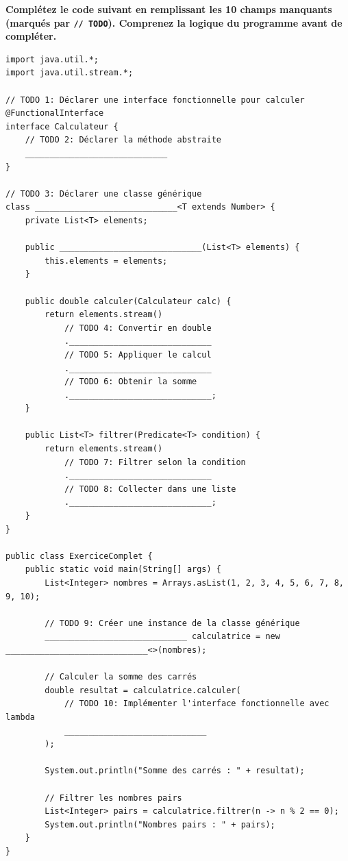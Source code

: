 \documentclass[11pt,a4paper]{article}
\begin{document}
\textbf{Complétez le code suivant en remplissant les 10 champs manquants (marqués par \texttt{// TODO}). Comprenez la logique du programme avant de compléter.}

\begin{lstlisting}
import java.util.*;
import java.util.stream.*;

// TODO 1: Déclarer une interface fonctionnelle pour calculer
@FunctionalInterface
interface Calculateur {
    // TODO 2: Déclarer la méthode abstraite
    _____________________________
}

// TODO 3: Déclarer une classe générique
class _____________________________<T extends Number> {
    private List<T> elements;
    
    public _____________________________(List<T> elements) {
        this.elements = elements;
    }
    
    public double calculer(Calculateur calc) {
        return elements.stream()
            // TODO 4: Convertir en double
            ._____________________________
            // TODO 5: Appliquer le calcul
            ._____________________________
            // TODO 6: Obtenir la somme
            ._____________________________;
    }
    
    public List<T> filtrer(Predicate<T> condition) {
        return elements.stream()
            // TODO 7: Filtrer selon la condition
            ._____________________________
            // TODO 8: Collecter dans une liste
            ._____________________________;
    }
}

public class ExerciceComplet {
    public static void main(String[] args) {
        List<Integer> nombres = Arrays.asList(1, 2, 3, 4, 5, 6, 7, 8, 9, 10);
        
        // TODO 9: Créer une instance de la classe générique
        _____________________________ calculatrice = new _____________________________<>(nombres);
        
        // Calculer la somme des carrés
        double resultat = calculatrice.calculer(
            // TODO 10: Implémenter l'interface fonctionnelle avec lambda
            _____________________________
        );
        
        System.out.println("Somme des carrés : " + resultat);
        
        // Filtrer les nombres pairs
        List<Integer> pairs = calculatrice.filtrer(n -> n % 2 == 0);
        System.out.println("Nombres pairs : " + pairs);
    }
}
\end{lstlisting}
\end{document}
